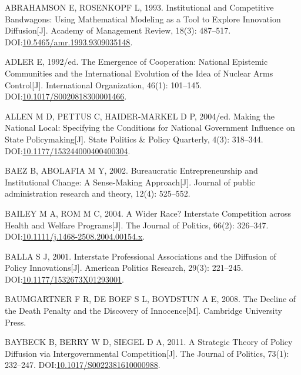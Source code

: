 \documentclass[
  12pt,
]{ctexart}
\newlength{\cslhangindent}
\newlength{\cslentryspacingunit} %
\newenvironment{CSLReferences}[2] %
 {%
  \setlength{\parindent}{0pt}
  \ifodd #1
  \let\oldpar\par
  \def\par{\hangindent=\cslhangindent\oldpar}
  \fi
  \setlength{\parskip}{#2\cslentryspacingunit}
 }%
 {}
\begin{document}
\hypertarget{refs}{}
\begin{CSLReferences}{1}{0}
\leavevmode{}%
ABRAHAMSON E, ROSENKOPF L, 1993. Institutional and Competitive Bandwagons: Using Mathematical Modeling as a Tool to Explore Innovation Diffusion{[}J{]}. Academy of Management Review, 18(3): 487--517. DOI:\href{https://doi.org/10.5465/amr.1993.9309035148}{10.5465/amr.1993.9309035148}.

\leavevmode{}%
ADLER E, 1992/ed. The Emergence of Cooperation: National Epistemic Communities and the International Evolution of the Idea of Nuclear Arms Control{[}J{]}. International Organization, 46(1): 101--145. DOI:\href{https://doi.org/10.1017/S0020818300001466}{10.1017/S0020818300001466}.

\leavevmode{}%
ALLEN M D, PETTUS C, HAIDER-MARKEL D P, 2004/ed. Making the {National Local}: {Specifying} the {Conditions} for {National Government Influence} on {State Policymaking}{[}J{]}. State Politics \& Policy Quarterly, 4(3): 318--344. DOI:\href{https://doi.org/10.1177/153244000400400304}{10.1177/153244000400400304}.

\leavevmode{}%
BAEZ B, ABOLAFIA M Y, 2002. Bureaucratic Entrepreneurship and Institutional Change: A Sense-Making Approach{[}J{]}. Journal of public administration research and theory, 12(4): 525--552.

\leavevmode{}%
BAILEY M A, ROM M C, 2004. A {Wider Race}? {Interstate Competition} across {Health} and {Welfare Programs}{[}J{]}. The Journal of Politics, 66(2): 326--347. DOI:\href{https://doi.org/10.1111/j.1468-2508.2004.00154.x}{10.1111/j.1468-2508.2004.00154.x}.

\leavevmode{}%
BALLA S J, 2001. Interstate {Professional Associations} and the {Diffusion} of {Policy Innovations}{[}J{]}. American Politics Research, 29(3): 221--245. DOI:\href{https://doi.org/10.1177/1532673X01293001}{10.1177/1532673X01293001}.

\leavevmode{}%
BAUMGARTNER F R, DE BOEF S L, BOYDSTUN A E, 2008. The Decline of the Death Penalty and the Discovery of Innocence{[}M{]}. {Cambridge University Press}.

\leavevmode{}%
BAYBECK B, BERRY W D, SIEGEL D A, 2011. A {Strategic Theory} of {Policy Diffusion} via {Intergovernmental Competition}{[}J{]}. The Journal of Politics, 73(1): 232--247. DOI:\href{https://doi.org/10.1017/S0022381610000988}{10.1017/S0022381610000988}.


\end{CSLReferences}
\end{document}
